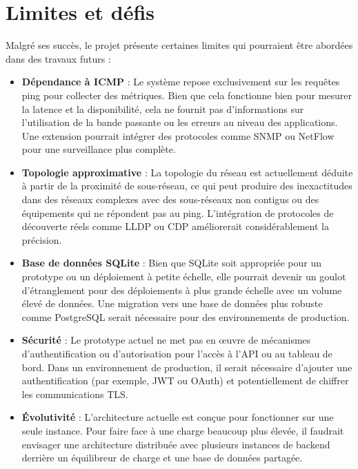 \documentclass[12pt,a4paper]{report}
\begin{document}
\section{Limites et défis}
Malgré ses succès, le projet présente certaines limites qui pourraient être abordées dans des travaux futurs :
\begin{itemize}
    \item \textbf{Dépendance à ICMP} : Le système repose exclusivement sur les requêtes ping pour collecter des métriques. Bien que cela fonctionne bien pour mesurer la latence et la disponibilité, cela ne fournit pas d'informations sur l'utilisation de la bande passante ou les erreurs au niveau des applications. Une extension pourrait intégrer des protocoles comme SNMP ou NetFlow pour une surveillance plus complète.
    \item \textbf{Topologie approximative} : La topologie du réseau est actuellement déduite à partir de la proximité de sous-réseau, ce qui peut produire des inexactitudes dans des réseaux complexes avec des sous-réseaux non contigus ou des équipements qui ne répondent pas au ping. L'intégration de protocoles de découverte réels comme LLDP ou CDP améliorerait considérablement la précision.
    \item \textbf{Base de données SQLite} : Bien que SQLite soit appropriée pour un prototype ou un déploiement à petite échelle, elle pourrait devenir un goulot d'étranglement pour des déploiements à plus grande échelle avec un volume élevé de données. Une migration vers une base de données plus robuste comme PostgreSQL serait nécessaire pour des environnements de production.
    \item \textbf{Sécurité} : Le prototype actuel ne met pas en œuvre de mécanismes d'authentification ou d'autorisation pour l'accès à l'API ou au tableau de bord. Dans un environnement de production, il serait nécessaire d'ajouter une authentification (par exemple, JWT ou OAuth) et potentiellement de chiffrer les communications TLS.
    \item \textbf{Évolutivité} : L'architecture actuelle est conçue pour fonctionner sur une seule instance. Pour faire face à une charge beaucoup plus élevée, il faudrait envisager une architecture distribuée avec plusieurs instances de backend derrière un équilibreur de charge et une base de données partagée.
\end{itemize}
\end{document}
